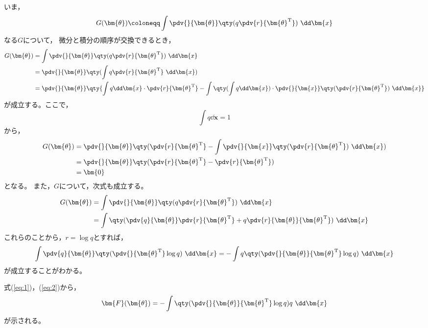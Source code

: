 \documentclass[class=jsarticle, crop=false, dvipdfmx, fleqn]{standalone}
\begin{document}
いま，
\begin{equation}
	G(\bm{\theta}) \coloneqq \int \pdv{}{\bm{\theta}} \qty(q \pdv{r}{\bm{\theta}^\mathrm{T}}) \ \dd\bm{x}
\end{equation}
なる\(G\)について，
微分と積分の順序が交換できるとき，
\begin{align}
	G(\bm{\theta})
		& = \int \pdv{}{\bm{\theta}} \qty(q \pdv{r}{\bm{\theta}^\mathrm{T}}) \ \dd\bm{x} \\
		& = \pdv{}{\bm{\theta}} \qty(\int q \pdv{r}{\bm{\theta}^\mathrm{T}} \ \dd\bm{x}) \\
		& = \pdv{}{\bm{\theta}} \qty{\int q \dd\bm{x} \cdot \pdv{r}{\bm{\theta}^\mathrm{T}} - \int \qty(\int q \dd\bm{x}) \cdot \pdv{}{\bm{x}} \qty(\pdv{r}{\bm{\theta}^\mathrm{T}}) \ \dd\bm{x}}
\end{align}
が成立する。ここで，
\begin{equation}
	\int q \dd\bm{x} = 1
\end{equation}
から，
\begin{align}
	G(\bm{\theta})
		& = \pdv{}{\bm{\theta}} \qty(\pdv{r}{\bm{\theta}^\mathrm{T}} - \int \pdv{}{\bm{x}} \qty(\pdv{r}{\bm{\theta}^\mathrm{T}}) \ \dd\bm{x}) \\
		& = \pdv{}{\bm{\theta}} \qty(\pdv{r}{\bm{\theta}^\mathrm{T}} - \pdv{r}{\bm{\theta}^\mathrm{T}}) \\
		& = \bm{0}
\end{align}
となる。
また，\(G\)について，次式も成立する。
\begin{align}
	G(\bm{\theta})
		& = \int \pdv{}{\bm{\theta}} \qty(q \pdv{r}{\bm{\theta}^\mathrm{T}}) \ \dd\bm{x} \\
		& = \int \qty(\pdv{q}{\bm{\theta}} \pdv{r}{\bm{\theta}^\mathrm{T}} + q \pdv{r}{\bm{\theta}}{\bm{\theta}^\mathrm{T}})\ \dd\bm{x}
\end{align}
これらのことから，\(r = \log{q}\)とすれば，
\begin{equation}
	\int \pdv{q}{\bm{\theta}} \qty(\pdv{}{\bm{\theta}^\mathrm{T}} \log{q} )\ \dd\bm{x} = - \int q \qty(\pdv{}{\bm{\theta}}{\bm{\theta}^\mathrm{T}} \log{q})\ \dd\bm{x} \label{eq:2}
\end{equation}
が成立することがわかる。

式(\ref{eq:1})，(\ref{eq:2})から，
\begin{align}
	\bm{F}(\bm{\theta}) = - \int \qty(\pdv{}{\bm{\theta}}{\bm{\theta}^\mathrm{T}} \log{q}) q\ \dd\bm{x}
\end{align}
が示される。
\end{document}
